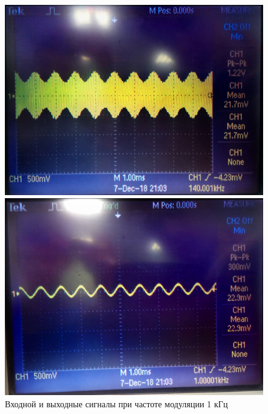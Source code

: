 \begin{figure}[H]
	\centering
	\begin{minipage}{0.4\linewidth}
	\includegraphics[width=0.9\linewidth]{photo/1k1.jpg}
	\end{minipage}
	\begin{minipage}{0.4\linewidth}
	\includegraphics[width=0.9\linewidth]{photo/1k2.jpg}
	\end{minipage}
	\caption{Входной и выходные сигналы при частоте модуляции 1 кГц}
	\label{off:1}
\end{figure}

